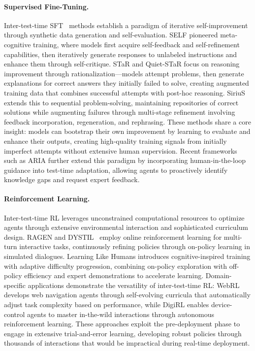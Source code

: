 \documentclass[10pt]{article} %
\begin{document}
\paragraph{Supervised Fine-Tuning.} Inter-test-time SFT~\citep{chen2025sft} methods establish a paradigm of iterative self-improvement through synthetic data generation and self-evaluation. SELF \citep{lu2023self} pioneered meta-cognitive training, where models first acquire self-feedback and self-refinement capabilities, then iteratively generate responses to unlabeled instructions and enhance them through self-critique. STaR \citep{zelikman2022star} and Quiet-STaR \citep{zelikman2024quiet} focus on reasoning improvement through rationalization—models attempt problems, then generate explanations for correct answers they initially failed to solve, creating augmented training data that combines successful attempts with post-hoc reasoning. SiriuS \citep{zhao2025sirius} extends this to sequential problem-solving, maintaining repositories of correct solutions while augmenting failures through multi-stage refinement involving feedback incorporation, regeneration, and rephrasing. These methods share a core insight: models can bootstrap their own improvement by learning to evaluate and enhance their outputs, creating high-quality training signals from initially imperfect attempts without extensive human supervision. Recent frameworks such as ARIA \citep{he-etal-2025-enabling} further extend this paradigm by incorporating human-in-the-loop guidance into test-time adaptation, allowing agents to proactively identify knowledge gaps and request expert feedback.


\paragraph{Reinforcement Learning.} Inter-test-time RL leverages unconstrained computational resources to optimize agents through extensive environmental interaction and sophisticated curriculum design. RAGEN \citep{wang2025ragen} and DYSTIL~\citep{wang2025dystildynamicstrategyinduction}  employ online reinforcement learning for multi-turn interactive tasks, continuously refining policies through on-policy learning in simulated dialogues. Learning Like Humans \citep{zhang2025learning} introduces cognitive-inspired training with adaptive difficulty progression, combining on-policy exploration with off-policy efficiency and expert demonstrations to accelerate learning. Domain-specific applications demonstrate the versatility of inter-test-time RL: WebRL \citep{qi2024webrl} develops web navigation agents through self-evolving curricula that automatically adjust task complexity based on performance, while DigiRL \citep{bai2024digirl} enables device-control agents to master in-the-wild interactions through autonomous reinforcement learning. 
These approaches exploit the pre-deployment phase to engage in extensive trial-and-error learning, developing robust policies through thousands of interactions that would be impractical during real-time deployment.
\end{document}
